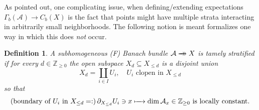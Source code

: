 \documentclass[11pt,leqno]{article}
\theoremstyle{plain}
\theoremstyle{plain}
\theoremstyle{plain}
\newtheorem{definition}[lemma]{Definition}
\numberwithin{equation}{section}
\theoremstyle{nonumberplain}
\newcommand\bZ{{\mathbb Z}}
\newcommand\cA{{\mathcal A}}
\newcommand\1{{\bf 1}}
\newcommand{\xrightarrowdbl}[2][]{%
  \xrightarrow[#1]{#2}\mathrel{\mkern-14mu}\rightarrow
}
\begin{document}

As  pointed out, one complicating issue, when defining/extending expectations $\Gamma_b(\cA)\to C_b(X)$ is the fact that points might have multiple strata interacting in arbitrarily small neighborhoods. The following notion is meant formalizes one way in which this does {\it not} occur.

\begin{definition}\label{def:tame.strat}
  A subhomogeneous (F) Banach bundle $\cA\xrightarrowdbl{}X$ is {\it tamely stratified} if for every $d\in \bZ_{\ge 0}$ the open subspace $X_d\subseteq X_{\le d}$ is a disjoint union
  \begin{equation}\label{eq:xd.clopen.part}
    X_d = \coprod_{i\in I}U_i
    ,\quad
    U_i\text{ clopen in }X_{\le d}
  \end{equation}
  so that
  \begin{equation*}
    \left(\text{boundary of $U_i$ in $X_{\le d}$}=:\right)
    \partial_{X_{\le d}} U_i
    \ni x
    \xmapsto{\quad}
    \dim \cA_x
    \in \bZ_{\ge 0}
    \text{ is locally constant}.
  \end{equation*}
\end{definition}
\end{document}
